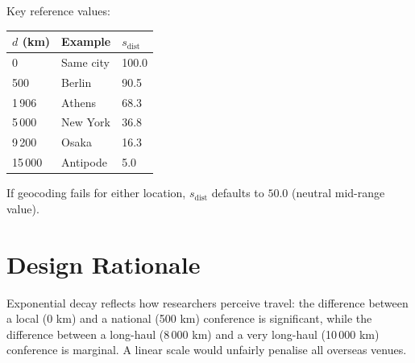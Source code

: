 \documentclass[11pt, a4paper]{article}
\begin{document}
\noindent Key reference values:

\begin{center}
\begin{tabular}{lll}
\hline
$d$ (km) & Example & $s_{\text{dist}}$ \\
\hline
0       & Same city          & 100.0 \\
500     & Berlin             &  90.5 \\
1\,906  & Athens             &  68.3 \\
5\,000  & New York           &  36.8 \\
9\,200  & Osaka              &  16.3 \\
15\,000 & Antipode           &   5.0 \\
\hline
\end{tabular}
\end{center}

\noindent If geocoding fails for either location, $s_{\text{dist}}$ defaults to $50.0$
(neutral mid-range value).

\section*{Design Rationale}

Exponential decay reflects how researchers perceive travel: the difference between
a local (0 km) and a national (500 km) conference is significant, while the
difference between a long-haul (8\,000 km) and a very long-haul (10\,000 km)
conference is marginal. A linear scale would unfairly penalise all overseas venues.
\end{document}
